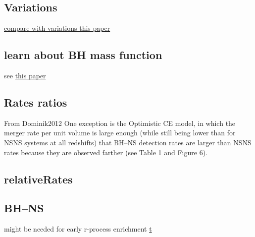 \documentclass[twocolumn]{aastex63}
\begin{document}

\subsection{Variations}
\label{subsec:bhns-discussion-variations}

\href{https://arxiv.org/pdf/1708.07885.pdf}{compare with variations this paper}


\subsection{learn about \ac{BH} mass function}
%
see \href{https://arxiv.org/pdf/2002.02981.pdf}{this paper}

\subsection{Rates ratios}
From Dominik2012
One exception is the Optimistic \ac{CE} model, in which the merger rate per unit volume is large enough (while still being lower than for NSNS systems at all redshifts) that BH--NS detection rates are larger than NSNS rates because they are observed farther (see Table 1 and Figure 6).

%
\subsection{relativeRates}
%


\subsection{BH--NS}
might be needed for early r-process enrichment \href{https://arxiv.org/pdf/1601.06966.pdf} t%
\end{document}
